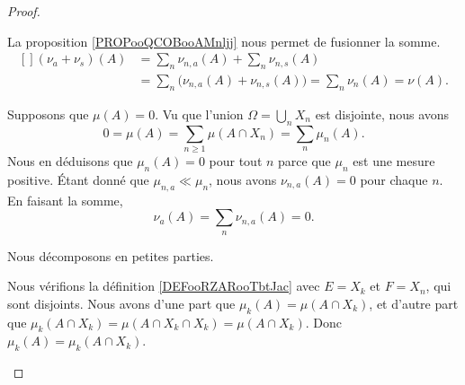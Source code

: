 \begin{proof}
\begin{subproof}
		\spitem[\( \nu=\nu_a+\nu_s\)]

		La proposition \ref{PROPooQCOBooAMnljj} nous permet de fusionner la somme.
		\begin{equation}
			\begin{aligned}[]
				(\nu_a+\nu_s)(A) & =\sum_n\nu_{n,a}(A)+\sum_n\nu_{n,s}(A)                              \\
				                 & =\sum_n\Big( \nu_{n,a}(A)+\nu_{n,s}(A) \Big)=\sum_n\nu_n(A)=\nu(A).
			\end{aligned}
		\end{equation}

		\spitem[\( \nu_a\ll\mu\)]

		Supposons que \( \mu(A)=0\). Vu que l'union \( \Omega=\bigcup_nX_n\) est disjointe, nous avons
		\begin{equation}
			0=\mu(A)=\sum_{n\geq 1}\mu(A\cap X_n)=\sum_n\mu_n(A).
		\end{equation}
		Nous en déduisons que \( \mu_n(A)=0\) pour tout \( n\) parce que \( \mu_n\) est une mesure positive. Étant donné que \( \mu_{n,a}\ll \mu_n\), nous avons \( \nu_{n,a}(A)=0\) pour chaque \( n\). En faisant la somme,
		\begin{equation}
			\nu_a(A)=\sum_n\nu_{n,a}(A)=0.
		\end{equation}

		\spitem[\( \nu_s\perp \mu\)]
		Nous décomposons en petites parties.
		\begin{subproof}
			Nous vérifions la définition \ref{DEFooRZARooTbtJac} avec \( E=X_k\) et \( F=X_n\), qui sont disjoints. Nous avons d'une part que \( \mu_k(A)=\mu(A\cap X_k)\), et d'autre part que \( \mu_k(A\cap X_k)=\mu(A\cap X_k\cap X_k)=\mu(A\cap X_k)\). Donc \( \mu_k(A)=\mu_k(A\cap X_k)\).


\end{subproof}
\end{subproof}
\end{proof}
